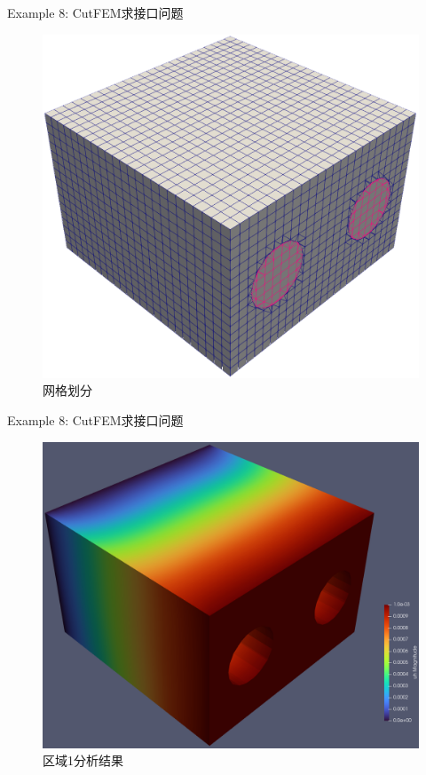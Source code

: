 \documentclass[lang=en,aspectratio=43,theme=default,logo=on]{simplebeamer}
\begin{document}
\begin{frame}{Example 8: CutFEM求接口问题}
    \begin{figure}
        \centering %
        \includegraphics[height=0.8\textheight]{./img/027.png}
        \caption{网格划分}
    \end{figure}
\end{frame}

\begin{frame}{Example 8: CutFEM求接口问题}
    \begin{figure}
        \centering %
        \includegraphics[height=0.7\textheight]{./img/028.png}
        \caption{区域1分析结果}
    \end{figure}
\end{frame}
\end{document}
